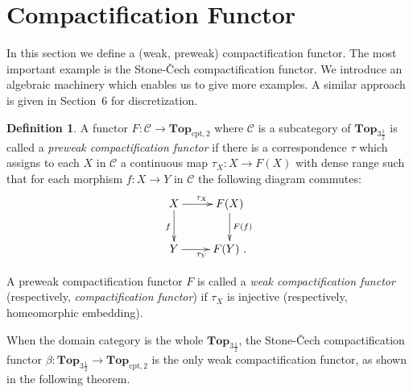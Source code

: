 \documentclass[manuscript]{amsart}
\theoremstyle{definition}
\newtheorem{definition}{Definition}[section]
\begin{document}
\section{Compactification Functor}
\noindent
In this section we define a (weak, preweak) compactification functor.
The most important example is the Stone-\v{C}ech compactification functor.
We introduce an algebraic machinery
which enables us to give more examples. A similar approach is given in Section~6 for discretization.
\begin{definition}\label{defcofu}
A  functor
$F: \mathcal{C}\to  \mathbf{Top}_{\mathrm{cpt,2}}$ where
$\mathcal{C}$ is a subcategory of  $\mathbf{Top}_{3\frac{1}{2}}$
is called a \emph{preweak compactification functor}
if
there is a correspondence $\tau$ which assigns to each $X$ in $\mathcal{C}$
 a continuous map $\tau_{X}:X\to F(X)$ with dense range  such that for each morphism
$f:X\to Y$ in $\mathcal{C}$
the following diagram commutes:
\[
\xymatrix{
X \ar[d]_{f}\ar[r]^{\tau_{X}} & F(X) \ar[d]^{F(f)} \\
Y\ar[r]_{\tau_{Y}}  & F(Y)\ .
}
\]

A preweak compactification functor
$F$ is called a \emph{weak compactification functor} (respectively, \textit{compactification functor})
if $\tau_{X}$ is  injective (respectively, homeomorphic embedding).
\end{definition}
When the domain category is the whole $\mathbf{Top}_{3\frac{1}{2}}$,
the Stone-\v{C}ech compactification functor
$\beta : \mathbf{Top}_{3\frac{1}{2}}\to \mathbf{Top}_{\mathrm{cpt,2}}$
 is the only weak compactification functor, as shown in the following theorem.
 
\end{document}
